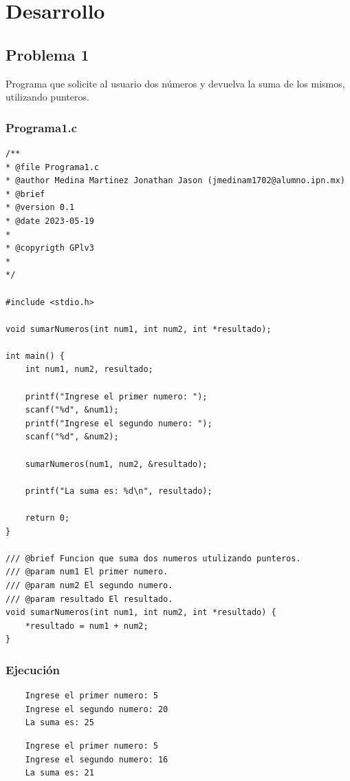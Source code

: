 \documentclass{article}
\begin{document}
	\newpage
	\section{Desarrollo}
	
	\subsection{Problema 1}
	
	Programa que solicite al usuario dos números y devuelva la suma de los mismos, utilizando punteros.
	
	\subsubsection{Programa1.c}
	
	\begin{lstlisting}
/**
* @file Programa1.c
* @author Medina Martinez Jonathan Jason (jmedinam1702@alumno.ipn.mx)
* @brief 
* @version 0.1
* @date 2023-05-19
* 
* @copyrigth GPlv3
* 
*/

#include <stdio.h>

void sumarNumeros(int num1, int num2, int *resultado);

int main() {
	int num1, num2, resultado;
	
	printf("Ingrese el primer numero: ");
	scanf("%d", &num1);
	printf("Ingrese el segundo numero: ");
	scanf("%d", &num2);
	
	sumarNumeros(num1, num2, &resultado);
	
	printf("La suma es: %d\n", resultado);
	
	return 0;
}

/// @brief Funcion que suma dos numeros utulizando punteros.
/// @param num1 El primer numero.
/// @param num2 El segundo numero.
/// @param resultado El resultado.
void sumarNumeros(int num1, int num2, int *resultado) {
	*resultado = num1 + num2;
}
	\end{lstlisting}
	
	\subsubsection{Ejecución}
	
	\begin{lstlisting}
	Ingrese el primer numero: 5
	Ingrese el segundo numero: 20
	La suma es: 25
	\end{lstlisting}
	
	\begin{lstlisting}
	Ingrese el primer numero: 5
	Ingrese el segundo numero: 16
	La suma es: 21
	\end{lstlisting}
	
\end{document}
